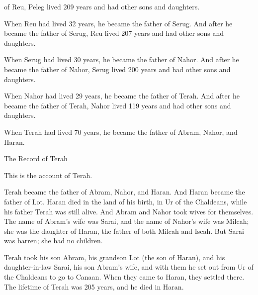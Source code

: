 {of Reu,
Peleg
lived
209
years
and had other sons
and daughters.
\par }{\PP {}When
Reu
had lived
32
years,
he became the father
of Serug.
And after
he became the father
of Serug,
Reu
lived
207
years
and had other sons
and daughters.
\par }{\PP {}When
Serug
had lived
30
years,
he became the father
of Nahor.
And after
he became the father
of Nahor,
Serug
lived
200
years
and had other
sons
and daughters.
\par }{\PP {}When
Nahor
had lived
29
years,
he became the father
of Terah.
And after
he became the father
of Terah,
Nahor
lived
119
years
and had other sons
and daughters.
\par }{\PP {}When
Terah
had lived
70
years,
he became the father
of Abram,
Nahor,
and Haran.
\par }{\SH The Record of Terah
\par }{\PP {}This
is the account
of Terah.
\par }{\PP Terah
became the father
of Abram,
Nahor,
and Haran.
And Haran
became the father
of Lot.
Haran
died
in the land
of his birth,
in Ur
of the Chaldeans,
while his father
Terah was still alive.
And Abram
and Nahor
took
wives
for themselves. The name
of Abram’s
wife
was Sarai,
and the name
of Nahor’s
wife
was Milcah;
she was the daughter
of Haran,
the father
of both Milcah
and Iscah.
But Sarai
was barren;
she had no
children.
\par }{\PP {}Terah
took
his son
Abram,
his grandson
Lot
(the son
of Haran), and his daughter-in-law
Sarai,
his son
Abram’s
wife,
and with them
he set out
from Ur
of the Chaldeans
to go
to Canaan.
When they came
to
Haran,
they settled
there.
The lifetime
of Terah
was 205
years,
and he
died
in Haran.

\par }
